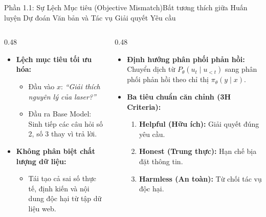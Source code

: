 \begin{frame}{Phần 1.1: Sự Lệch Mục tiêu (Objective Mismatch)}{Bất tương thích giữa Huấn luyện Dự đoán Văn bản và Tác vụ Giải quyết Yêu cầu}
  \begin{columns}[T,onlytextwidth]
    \begin{column}{0.48\textwidth}
      \small
      \begin{itemize}\setlength{\itemsep}{7pt}
        \item \textbf{Lệch mục tiêu tối ưu hóa:}
          \begin{itemize}\footnotesize\setlength{\itemsep}{3pt}
            \item Đầu vào $x$: \textit{``Giải thích nguyên lý của laser?''}
            \item Đầu ra Base Model: Sinh tiếp các câu hỏi số 2, số 3 thay vì trả lời.
          \end{itemize}
        \item \textbf{Không phân biệt chất lượng dữ liệu:}
          \begin{itemize}\footnotesize\setlength{\itemsep}{3pt}
            \item Tái tạo cả sai số thực tế, định kiến và nội dung độc hại từ tập dữ liệu web.
          \end{itemize}
      \end{itemize}
    \end{column}
    \begin{column}{0.48\textwidth}
      \small
      \begin{itemize}\setlength{\itemsep}{7pt}
        \item \textbf{Định hướng phân phối phản hồi:} Chuyển dịch từ $P_\theta(u_t \mid u_{<t})$ sang phân phối phản hồi theo chỉ thị $\pi_\theta(y \mid x)$.
        \item \textbf{Ba tiêu chuẩn căn chỉnh (3H Criteria):}
          \begin{enumerate}\footnotesize\setlength{\itemsep}{3pt}
            \item \textbf{Helpful (Hữu ích):} Giải quyết đúng yêu cầu.
            \item \textbf{Honest (Trung thực):} Hạn chế bịa đặt thông tin.
            \item \textbf{Harmless (An toàn):} Từ chối tác vụ độc hại.
          \end{enumerate}
      \end{itemize}
    \end{column}
  \end{columns}
\end{frame}

